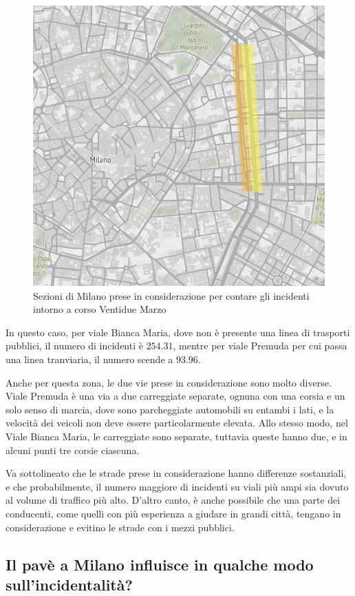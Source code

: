 \documentclass[a4paper,12pt]{report}
\begin{document}
\begin{figure}
    \hfill\includegraphics[width=0.7\linewidth]{../src/atm/zona_22marzo_rect.png}\hspace*{\fill}
    \caption{Sezioni di Milano prese in considerazione per contare gli incidenti intorno a corso Ventidue Marzo}
    \label{fig:zona-22marzo-rect}
\end{figure}

In questo caso, per viale Bianca Maria, dove non è presente una linea di trasporti pubblici, 
il numero di incidenti è $254.31$, mentre per viale Premuda per cui passa una linea tranviaria, 
il numero scende a $93.96$.

Anche per questa zona, le due vie prese in considerazione sono molto diverse.
Viale Premuda è una via a due carreggiate separate, ognuna con una corsia e un solo senso 
di marcia, dove sono parcheggiate automobili su entambi i lati, e la velocità dei 
veicoli non deve essere particolarmente elevata.
Allo stesso modo, nel Viale Bianca Maria, le carreggiate sono separate, tuttavia queste 
hanno due, e in alcuni punti tre corsie ciascuna. 

Va sottolineato che le strade prese in considerazione hanno differenze sostanziali, e che 
probabilmente, il numero maggiore di incidenti su viali più ampi sia dovuto al 
volume di traffico più alto.
D'altro canto, è anche possibile che una parte dei conducenti, come quelli con più esperienza 
a giudare in grandi città, tengano in considerazione e evitino le strade con i mezzi pubblici.

\subsection{Il pavè a Milano influisce in qualche modo sull'incidentalità?}
\end{document}
